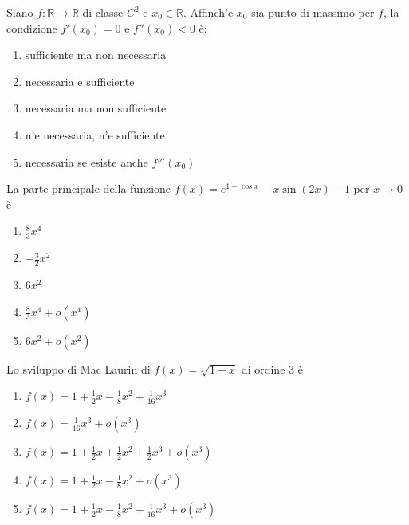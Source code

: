 \begin{quiz}
Siano $f:\mathbb R\to\mathbb R$ di classe $C^2$ e $x_0\in\mathbb R$. Affinch'e $x_0$ sia punto di massimo per $f$, la condizione $f'(x_0)=0$ e $f''(x_0)<0$ \`e:
\begin{enumerate}
\item sufficiente ma non necessaria
\item necessaria e sufficiente
\item necessaria ma non sufficiente
\item n'e necessaria, n'e sufficiente
\item necessaria se esiste anche $f'''(x_0)$
\end{enumerate}
\end{quiz}

\begin{quiz}
La parte principale della funzione $f(x)=e^{1-\cos x}-x\sin(2x)-1$ per $x\to0$ \`e
\begin{enumerate}
\item $\frac83x^4$
\item $-\frac32x^2$
\item $6x^2$
\item $\frac83x^4+o(x^4)$
\item $6x^2+o(x^2)$
\end{enumerate}
\end{quiz}

\begin{quiz}
Lo sviluppo di Mac Laurin di $f(x)=\sqrt{1+x}$ di ordine $3$ \`e
\begin{enumerate}
\item $f(x)=1+\frac12x-\frac18x^2+\frac1{16}x^3$
\item $f(x)=\frac1{16}x^3+o(x^3)$
\item $f(x)=1+\frac12x+\frac12x^2+\frac12x^3+o(x^3)$
\item $f(x)=1+\frac12x-\frac18x^2+o(x^3)$
\item $f(x)=1+\frac12x-\frac18x^2+\frac1{16}x^3+o(x^3)$
\end{enumerate}
\end{quiz}


